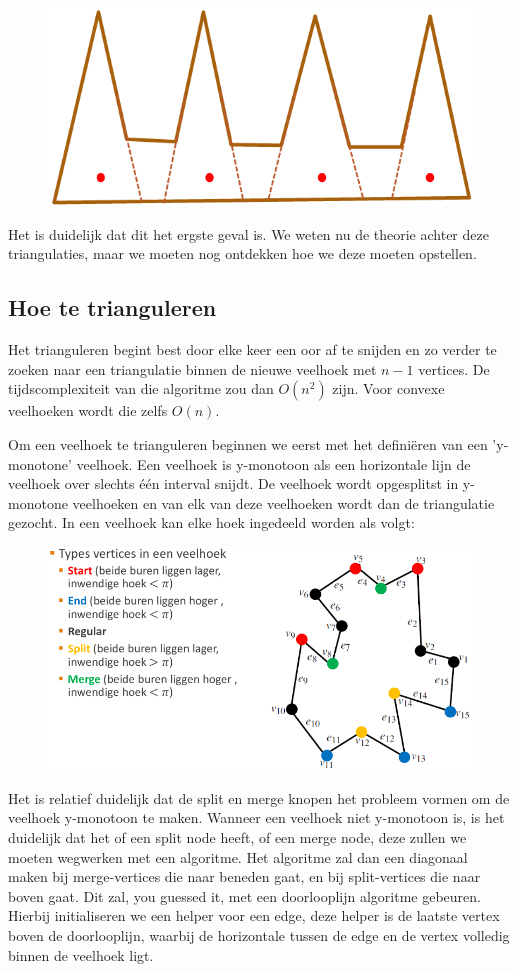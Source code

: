 \documentclass[12pt,a4paper]{article}
\begin{document}
	\begin{figure}[H]
		\centering
		\includegraphics[width=0.6\linewidth]{afbeeldingen/triangulatie-kam}
		\label{fig:triangulatie-kam}
	\end{figure}

	Het is duidelijk dat dit het ergste geval is. We weten nu de theorie achter deze triangulaties, maar we moeten nog ontdekken hoe we deze moeten opstellen. 
	
	
	\subsection{Hoe te trianguleren}
	Het trianguleren begint best door elke keer een oor af te snijden en zo verder te zoeken naar een triangulatie binnen de nieuwe veelhoek met $n-1$ vertices. De tijdscomplexiteit van die algoritme zou dan $O(n^2)$ zijn. Voor convexe veelhoeken wordt die zelfs $O(n)$. 
	
	Om een veelhoek te trianguleren beginnen we eerst met het definiëren van een 'y-monotone' veelhoek. Een veelhoek is y-monotoon als een horizontale lijn de veelhoek over slechts één interval snijdt. De veelhoek wordt opgesplitst in y-monotone veelhoeken en van elk van deze veelhoeken wordt dan de triangulatie gezocht. In een veelhoek kan elke hoek ingedeeld worden als volgt: 
	\begin{figure}[H]
		\centering
		\includegraphics[width=0.7\linewidth]{afbeeldingen/triangulaties-y-monotoon}
		\label{fig:triangulaties-y-monotoon}
	\end{figure}
	Het is relatief duidelijk dat de split en merge knopen het probleem vormen om de veelhoek y-monotoon te maken. Wanneer een veelhoek niet y-monotoon is, is het duidelijk dat het of een split node heeft, of een merge node, deze zullen we moeten wegwerken met een algoritme. Het algoritme zal dan een diagonaal maken bij merge-vertices die naar beneden gaat, en bij split-vertices die naar boven gaat. Dit zal, you guessed it, met een doorlooplijn algoritme gebeuren. Hierbij initialiseren we een helper voor een edge, deze helper is de laatste vertex boven de doorlooplijn, waarbij de horizontale tussen de edge en de vertex volledig binnen de veelhoek ligt. 
	
\end{document}
